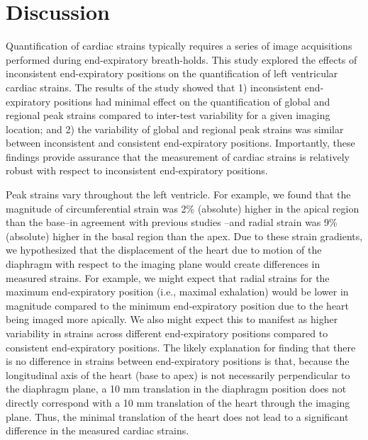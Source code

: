 \section{Discussion}
	Quantification of cardiac strains typically requires a series of image acquisitions performed during end-expiratory breath-holds. This study explored the effects of inconsistent end-expiratory positions on the quantification of left ventricular cardiac strains. The results of the study showed that 1) inconsistent end-expiratory positions had minimal effect on the quantification of global and regional peak strains compared to inter-test variability for a given imaging location; and 2) the variability of global and regional peak strains was similar between inconsistent and consistent end-expiratory positions. Importantly, these findings provide assurance that the measurement of cardiac strains is relatively robust with respect to inconsistent end-expiratory positions.
	
	Peak strains vary throughout the left ventricle. For example, we found that the magnitude of circumferential strain was 2\% (absolute) higher in the apical region than the base--in agreement with previous studies \cite{Kuijer2002,Moore2000,Young1994a,Feng2009,NasiraeiMoghaddam2010,Donekal2013a}--and radial strain was 9\% (absolute) higher in the basal region than the apex. Due to these strain gradients, we hypothesized that the displacement of the heart due to motion of the diaphragm with respect to the imaging plane would create differences in measured strains. For example, we might expect that radial strains for the maximum end-expiratory position (i.e., maximal exhalation) would be lower in magnitude compared to the minimum end-expiratory position due to the heart being imaged more apically. We also might expect this to manifest as higher variability in strains across different end-expiratory positions compared to consistent end-expiratory positions. The likely explanation for finding that there is no difference in strains between end-expiratory positions is that, because the longitudinal axis of the heart (base to apex) is not necessarily perpendicular to the diaphragm plane, a 10 mm translation in the diaphragm position does not directly correspond with a 10 mm translation of the heart through the imaging plane. Thus, the minimal translation of the heart does not lead to a significant difference in the measured cardiac strains.
	

